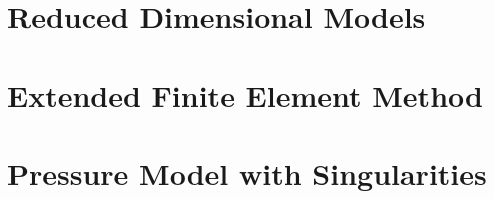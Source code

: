 \documentclass[bibliography=totocnumbered,dvipsnames,FM,Dis, EN]{tulthesis_autoreferat}
\begin{document}





\chapter{Reduced Dimensional Models} \label{chap:reduced}







\chapter{Extended Finite Element Method} \label{chap:xfem_soa}






\chapter{Pressure Model with Singularities} \label{chap:xfem_pressure}



% 

% 
\end{document}
